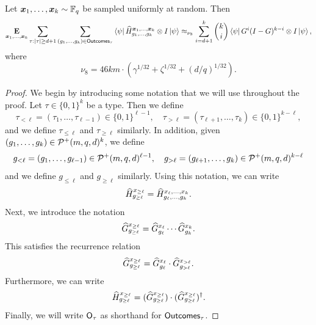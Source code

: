 \begin{lemma}
\label{lem:from-H-to-G}
Let ${\boldsymbol{x}}_1, \ldots, {\boldsymbol{x}}_k \sim \mathbb F_q$ be sampled uniformly at random.
Then
\begin{equation*}
\mathop{\bf E\/}_{{\boldsymbol{x}}_1, \dots, {\boldsymbol{x}}_k} \sum_{\tau:|\tau| \geq d+1} 
	\sum_{(g_1, \ldots, g_{k}) \in \mathsf{Outcomes}_{\tau}} \bra{\psi} \widehat{H}^{{\boldsymbol{x}}_1, \dots, {\boldsymbol{x}}_k}_{g_1, \dots, g_k} \otimes I \ket{\psi}
\approx_{\nu_8}
\sum_{i = d+1}^k \binom{k}{i} \bra{\psi} G^i (I-G)^{k-i} \otimes I \ket{\psi},
\end{equation*}
where
\begin{equation*}
\nu_8 = 46 k m \cdot \left( \gamma^{1/32} + \zeta^{1/32} +(d/q)^{1/32}\right).
\end{equation*}
\end{lemma}
\begin{proof}
We begin by introducing some notation that we will use throughout the proof.
Let $\tau \in \{0, 1\}^k$ be a type.
Then we define
\begin{equation*}
\tau_{< \ell}  = (\tau_1, \ldots, \tau_{\ell-1}) \in \{0, 1\}^{\ell-1},
\quad
\tau_{> \ell}  = (\tau_{\ell+1}, \ldots, \tau_{k}) \in \{0,1\}^{k-\ell},
\end{equation*}
and we define $\tau_{\leq \ell}$ and $\tau_{\geq \ell}$ similarly.
In addition, given $(g_1, \ldots, g_k) \in \mathcal{P}^+(m, q, d)^{k}$, we define
\begin{equation*}
g_{< \ell}  = (g_1, \ldots, g_{\ell-1}) \in \mathcal{P}^+(m, q, d)^{\ell-1},
\quad
g_{> \ell}  = (g_{\ell+1}, \ldots, g_{k}) \in \mathcal{P}^+(m, q, d)^{k-\ell}
\end{equation*}
and we define $g_{\leq \ell}$ and $g_{\geq \ell}$ similarly.
Using this notation, we can write
\begin{equation*}
 \widehat{H}^{x_{\geq \ell}}_{g_{\geq \ell}} = \widehat{H}^{x_{\ell}, \ldots, x_k}_{g_{\ell}, \ldots, g_k}.
\end{equation*}
Next, we introduce the notation
\begin{equation*}
\widehat{G}^{x_{\geq \ell}}_{g_{\geq \ell}} = \widehat{G}^{x_{\ell}}_{g_{\ell}} \cdots \widehat{G}^{x_k}_{g_k}.
\end{equation*}
This satisfies the recurrence relation
\begin{equation}\label{eq:G-recurrence}
\widehat{G}^{x_{\geq \ell}}_{g_{\geq \ell}} = \widehat{G}^{x_{\ell}}_{g_{\ell}} \cdot \widehat{G}^{x_{> \ell}}_{g_{> \ell}}.
\end{equation}
Furthermore, we can write
\begin{equation}\label{eq:split-H-into-two-Gs}
 \widehat{H}^{x_{\geq \ell}}_{g_{\geq \ell}} = (\widehat{G}^{x_{\geq \ell}}_{g_{\geq \ell}}) \cdot (\widehat{G}^{x_{\geq \ell}}_{g_{\geq \ell}})^\dagger.
\end{equation}
Finally, we will write $\mathsf{O}_{\tau}$ as shorthand for $\mathsf{Outcomes}_{\tau}$.




\end{proof}
